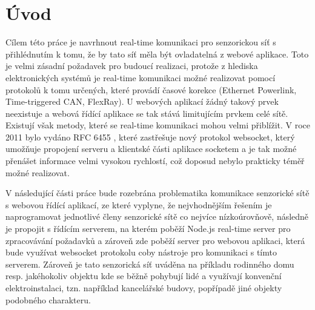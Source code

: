 \chapter{Úvod}
Cílem této práce je navrhnout real-time komunikaci pro senzorickou síť s přihlédnutím k tomu, že by tato síť měla být ovladatelná z webové aplikace. Toto je velmi zásadní požadavek pro budoucí realizaci, protože z hlediska elektronických systémů je real-time komunikaci možné realizovat pomocí protokolů k tomu určených, které provádí časové korekce (Ethernet Powerlink, Time-triggered CAN, FlexRay). U webových aplikací žádný takový prvek neexistuje a webová řídící aplikace se tak stává limitujícím prvkem celé sítě. Existují však metody, které se real-time komunikaci mohou velmi přiblížit. V roce 2011 bylo vydáno RFC 6455 \cite{rfc6455}, které zastřešuje nový protokol websocket, který umožňuje propojení serveru a klientské části aplikace socketem a je tak možné přenášet informace velmi vysokou rychlostí, což doposud nebylo prakticky téměř možné realizovat.

V následující části práce bude rozebrána problematika komunikace senzorické sítě s webovou řídící aplikací, ze které vyplyne, že nejvhodnějším řešením je naprogramovat jednotlivé členy senzorické sítě co nejvíce nízkoúrovňově, následně je propojit s řídícím serverem, na kterém poběží Node.js real-time server pro zpracovávání požadavků a zároveň zde poběží server pro webovou aplikaci, která bude využívat websocket protokolu coby nástroje pro komunikaci s tímto serverem. Zároveň je tato senzorická síť uváděna na příkladu rodinného domu resp. jakéhokoliv objektu kde se běžně pohybují lidé a využívají konvenční elektroinstalaci, tzn. například kancelářské budovy, popřípadě jiné objekty podobného charakteru.